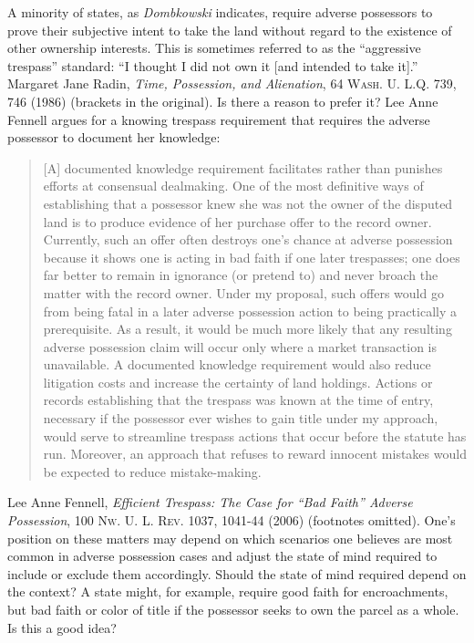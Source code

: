 
\item A minority of states, as \emph{Dombkowski} indicates, require adverse
possessors
to prove their subjective intent to take the land without regard to the
existence of other ownership interests. This is sometimes referred to as the
``aggressive trespass'' standard: ``I thought I did not own it [and intended to
take it].'' Margaret Jane Radin, \textit{Time, Possession, and Alienation}, 64
\textsc{Wash. U. L.Q.} 739, 746 (1986) (brackets in the original). Is there a
reason to prefer it? Lee Anne Fennell argues for a knowing trespass requirement
that requires the adverse possessor to document her knowledge:
\begin{quote}
[A] documented knowledge requirement facilitates rather than punishes efforts at
consensual dealmaking. One of the most definitive ways of establishing that a
possessor knew she was not the owner of the disputed land is to produce
evidence of her purchase offer to the record owner. Currently, such an offer
often destroys one's chance at adverse possession because it shows one is
acting in bad faith if one later trespasses; one does far better to remain in
ignorance (or pretend to) and never broach the matter with the record owner.
Under my proposal, such offers would go from being fatal in a later adverse
possession action to being practically a prerequisite. As a result, it would be
much more likely that any resulting adverse possession claim will occur only
where a market transaction is unavailable. A documented knowledge requirement
would also reduce litigation costs and increase the certainty of land holdings.
Actions or records establishing that the trespass was known at the time of
entry, necessary if the possessor ever wishes to gain title under my approach,
would serve to streamline trespass actions that occur before the statute has
run. Moreover, an approach that refuses to reward innocent mistakes would be
expected to reduce mistake-making.
\end{quote}
Lee Anne Fennell, \textit{Efficient Trespass: The Case for ``Bad Faith'' Adverse
Possession}, 100 \textsc{Nw. U. L. Rev}. 1037, 1041-44 (2006) (footnotes
omitted). One's position on these matters may depend on which scenarios one
believes are most common in adverse possession cases and adjust the state of
mind required to include or exclude them accordingly. Should the state of mind
required depend on the context? A state might, for example, require good faith
for encroachments, but bad faith or color of title if the possessor seeks to
own the parcel as a whole. Is this a good idea? 

